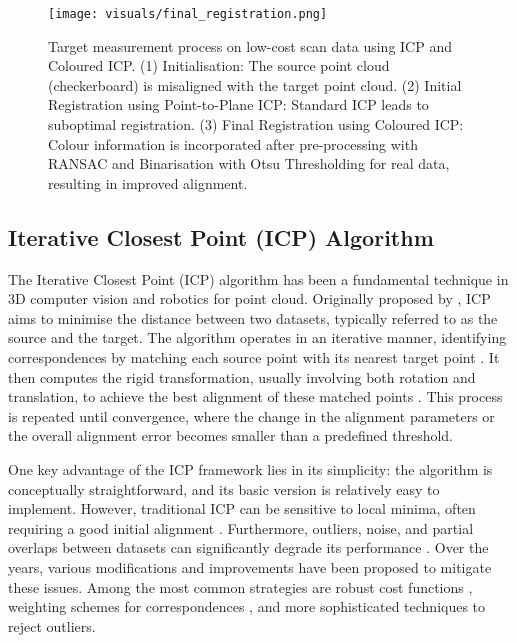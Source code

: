 \begin{figure*}[t]
  \centering
    \texttt{[image: visuals/final\_registration.png]}
    \caption{Target measurement process on low-cost scan data using ICP and Coloured ICP. (1) Initialisation: The source point cloud (checkerboard) is misaligned with the target point cloud. (2) Initial Registration using Point-to-Plane ICP: Standard ICP leads to suboptimal registration. (3) Final Registration using Coloured ICP: Colour information is incorporated after pre-processing with RANSAC and Binarisation with Otsu Thresholding for real data, resulting in improved alignment.}
    \label{fig:Registration_visualisation}
\end{figure*}

\subsection{Iterative Closest Point (ICP) Algorithm}
The Iterative Closest Point (ICP) algorithm has been a fundamental technique in 3D computer vision and robotics for point cloud. Originally proposed by \cite{besl_method_1992}, ICP aims to minimise the distance between two datasets, typically referred to as the source and the target. The algorithm operates in an iterative manner, identifying correspondences by matching each source point with its nearest target point \citep{survey_ICP}. It then computes the rigid transformation, usually involving both rotation and translation, to achieve the best alignment of these matched points \citep{survey_ICP}. This process is repeated until convergence, where the change in the alignment parameters or the overall alignment error becomes smaller than a predefined threshold.

One key advantage of the ICP framework lies in its simplicity: the algorithm is conceptually straightforward, and its basic version is relatively easy to implement. However, traditional ICP can be sensitive to local minima, often requiring a good initial alignment \citep{zhang2021fast}. Furthermore, outliers, noise, and partial overlaps between datasets can significantly degrade its performance \citep{zhang2021fast, bouaziz2013sparse}. Over the years, various modifications and improvements \citep{gelfand2005robust, rusu2009fast, aiger20084, gruen2005least, fitzgibbon2003robust} have been proposed to mitigate these issues. Among the most common strategies are robust cost functions \citep{fitzgibbon2003robust}, weighting schemes for correspondences \citep{rusu2009fast}, and more sophisticated techniques \citep{gelfand2005robust, bouaziz2013sparse} to reject outliers. 

